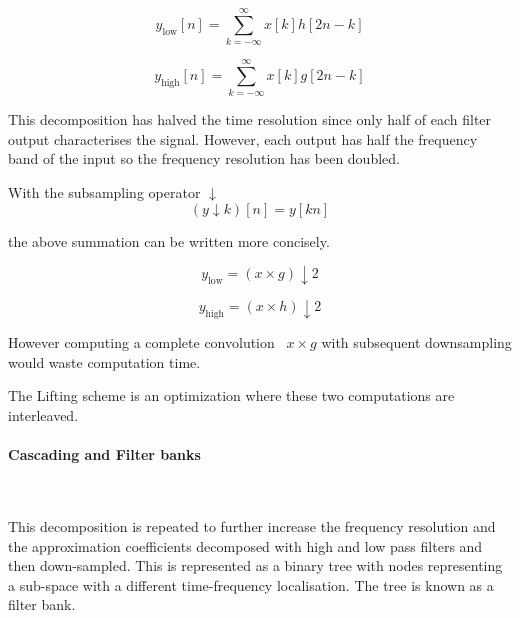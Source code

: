 \documentclass[a4paper,11pt]{article}
\begin{document}
    \begin{equation}
    y_{\mathrm{low}} [n] = \sum\limits_{k =  - \infty }^\infty  {x[k] h[2 n - k]} 
    \end{equation}

    \begin{equation}
    y_{\mathrm{high}} [n] = \sum\limits_{k =  - \infty }^\infty  {x[k] g[2 n - k]} 
    \end{equation}
    \par This decomposition has halved the time resolution since only half of each filter output characterises the signal. However, each output has half the frequency band of the input so the frequency resolution has been doubled.
    \par With the subsampling operator $\downarrow$
    \begin{equation}
    (y \downarrow k)[n] = y[kn] 
    \end{equation}
    \par the above summation can be written more concisely.

    \begin{equation}
    y_{\mathrm{low}} = (x\times g)\downarrow 2 
    \end{equation}

    \begin{equation}
    y_{\mathrm{high}} = (x\times h)\downarrow 2 
    \end{equation}
    \par However computing a complete convolution ~$x\times g$ with subsequent downsampling would waste computation time.

    \par The Lifting scheme is an optimization where these two computations are interleaved.



\paragraph{Cascading and Filter banks}
\textrm{\\}
\par This decomposition is repeated to further increase the frequency resolution and the approximation coefficients decomposed with high and low pass filters and then down-sampled. This is represented as a binary tree with nodes representing a sub-space with a different time-frequency localisation. The tree is known as a filter bank.
\end{document}
